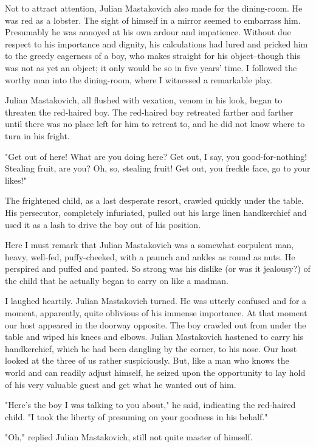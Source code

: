 Not to attract attention, Julian Mastakovich also made for the
dining-room. He was red as a lobster. The sight of himself in a mirror
seemed to embarrass him. Presumably he was annoyed at his own ardour
and impatience. Without due respect to his importance and dignity, his
calculations had lured and pricked him to the greedy eagerness of a
boy, who makes straight for his object--though this was not as yet an
object; it only would be so in five years' time. I followed the worthy
man into the dining-room, where I witnessed a remarkable play.

Julian Mastakovich, all flushed with vexation, venom in his look,
began to threaten the red-haired boy. The red-haired boy retreated
farther and farther until there was no place left for him to retreat
to, and he did not know where to turn in his fright.

"Get out of here! What are you doing here? Get out, I say, you
good-for-nothing! Stealing fruit, are you? Oh, so, stealing fruit! Get
out, you freckle face, go to your likes!"

The frightened child, as a last desperate resort, crawled quickly
under the table. His persecutor, completely infuriated, pulled out his
large linen handkerchief and used it as a lash to drive the boy out of
his position.

Here I must remark that Julian Mastakovich was a somewhat corpulent
man, heavy, well-fed, puffy-cheeked, with a paunch and ankles as round
as nuts. He perspired and puffed and panted. So strong was his dislike
(or was it jealousy?) of the child that he actually began to carry on
like a madman.

I laughed heartily. Julian Mastakovich turned. He was utterly confused
and for a moment, apparently, quite oblivious of his immense
importance. At that moment our host appeared in the doorway opposite.
The boy crawled out from under the table and wiped his knees and
elbows. Julian Mastakovich hastened to carry his handkerchief, which
he had been dangling by the corner, to his nose. Our host looked at
the three of us rather suspiciously. But, like a man who knows the
world and can readily adjust himself, he seized upon the opportunity
to lay hold of his very valuable guest and get what he wanted out of
him.

"Here's the boy I was talking to you about," he said, indicating the
red-haired child. "I took the liberty of presuming on your goodness in
his behalf."

"Oh," replied Julian Mastakovich, still not quite master of himself.

